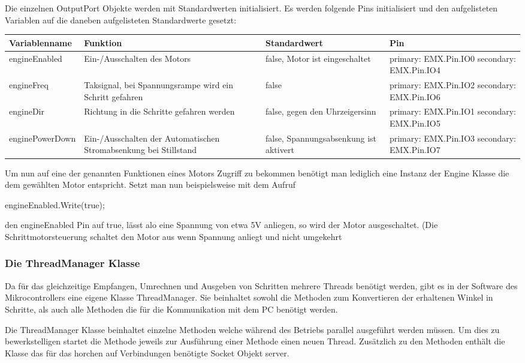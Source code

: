 Die einzelnen OutputPort Objekte werden mit Standardwerten initialisiert. Es werden folgende Pins initialisiert und den aufgelisteten Variablen auf die daneben aufgelisteten Standardwerte gesetzt:

\begin{tabular}{|p{3cm}|p{3.5cm}|p{3.5cm}|p{3.5cm}|}
\hline \rowcolor{lightgray}
\textbf{Variablenname} & \textbf{Funktion} & \textbf{Standardwert} &\textbf{Pin}\\
\hline
engineEnabled & Ein-/Ausschalten des Motors & false, Motor ist eingeschaltet & primary: EMX.Pin.IO0 secondary: EMX.Pin.IO4\\
\hline
engineFreq & Taksignal, bei Spannungsrampe wird ein Schritt gefahren & false & primary: EMX.Pin.IO2 secondary: EMX.Pin.IO6\\
\hline
engineDir & Richtung in die Schritte gefahren werden & false, gegen den Uhrzeigersinn & primary: EMX.Pin.IO1 secondary: EMX.Pin.IO5\\
\hline
enginePowerDown & Ein-/Ausschalten der Automatischen Stromabsenkung bei Stillstand & false, Spannungsabsenkung ist aktivert & primary: EMX.Pin.IO3 secondary: EMX.Pin.IO7\\
\hline
\end{tabular}

Um nun auf eine der genannten Funktionen eines Motors Zugriff zu bekommen benötigt man lediglich eine Instanz der Engine Klasse die dem gewählten Motor entspricht. Setzt man nun beispielsweise mit dem Aufruf

engineEnabled.Write(true);

den engineEnabled Pin auf true, lässt alo eine Spannung von etwa 5V anliegen, so wird der Motor ausgeschaltet. (Die Schrittmotorsteuerung schaltet den Motor aus wenn Spannung anliegt und nicht umgekehrt
\subsubsection{Die ThreadManager Klasse}
Da für das gleichzeitige Empfangen, Umrechnen und Ausgeben von Schritten mehrere Threads benötigt werden, gibt es in der Software des Mikrocontrollers eine eigene Klasse ThreadManager. Sie beinhaltet sowohl die Methoden zum Konvertieren der erhaltenen Winkel in Schritte, als auch alle Methoden die für die Kommunikation mit dem PC benötigt werden.

Die ThreadManager Klasse beinhaltet einzelne Methoden welche während des Betriebs parallel ausgeführt werden müssen. Um dies zu bewerkstelligen startet die Methode jeweils zur Ausführung einer Methode einen neuen Thread. Zusätzlich zu den Methoden enthält die Klasse das für das horchen auf Verbindungen benötigte Socket Objekt server.

